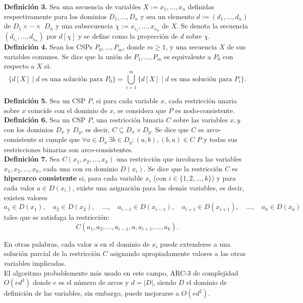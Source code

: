 \textbf{Definición 3.} Sea una secuencia de variables $X := x_1,..., x_n$ definidas respectivamente
para los dominios $D_1,..., D_n$ y sea un elemento $d:= (d_1,..., d_n)$ de $D_1 \times \cdots \times$
$D_n$ y una subsecuencia $\chi:= x_{i_1},..., x_{i_m}$ de $X$. Se denota la secuencia
$(d_{i_1},..., d_{i_m})$ por $d[\chi]$ y se define como la proyección de $d$ sobre $\chi$. \\


\textbf{Definición 4.} Sean los CSPs $P_0, \ldots, P_m$, donde $m \geq 1$, y una secuencia $X$ de sus variables comunes. Se dice que la unión 
de $P_1, \ldots, P_m$ es equivalente a $P_0$ con respecto a $X$ si:
\[ \{ d[X] \mid d \text{ es una solución para } P_0 \} = \bigcup_{i=1}^m \{ d[X] \mid d \text{ es una solución para } P_i \}. \]


\textbf{Definición 5.} Sea un CSP $P$, si para cada variable $x$, cada restricción unaria sobre $x$ coincide con el dominio de $x$, se considera
que $P$ es nodo-consistente. \\

\textbf{Definición 6.} Sea un CSP $P$, una restricción binaria $C$ sobre las variables $x, y$ con los dominios $D_x$ y $D_y$, es decir, $C \subseteq D_x \times D_y$. 
Se dice que $C$ es arco-consistente si cumple que $\forall a \in D_x \, \exists b \in D_y : (a, b),(b,a) \in C$  $P$ y todas sus restricciones binarias son 
arco-consistentes. \\


\textbf{Definición 7.} Sea \( C(x_1, x_2, \dots, x_k) \) una restricción que involucra las variables \( x_1, x_2, \dots, x_k \), cada una con su dominio \( D(x_i) \). Se dice
 que la restricción \( C \) es \textbf{hiperarco consistente} si, para cada variable \( x_i \) (con \( i \in \{1,2,\dots,k\} \)) y para cada valor 
 \( a \in D(x_i) \), existe una asignación para las demás variables, es decir, existen valores
\[
a_1 \in D(x_1),\quad a_2 \in D(x_2),\quad \dots,\quad a_{i-1} \in D(x_{i-1}),\quad a_{i+1} \in D(x_{i+1}),\quad \dots,\quad a_k \in D(x_k)
\]
tales que se satisfaga la restricción:
\[
C(a_1, a_2, \dots, a_{i-1}, a, a_{i+1}, \dots, a_k).
\]

En otras palabras, cada valor \( a \) en el dominio de \( x_i \) puede extenderse a una solución parcial de la restricción \( C \) asignando apropiadamente valores a las otras variables implicadas. \\


El algoritmo probablemente más usado en este campo, ARC-3 de complejidad $O(ed^3)$ donde $e$ es el número de arcos y $d=|D|$, siendo $D$ el dominio de definición de las variables, sin embargo, puede mejorarse a $O(ed^2)$. \\

